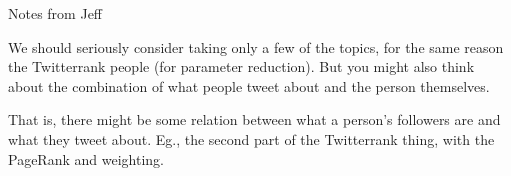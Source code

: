 Notes from Jeff

We should seriously consider taking only a few of the topics, for the same reason the Twitterrank people (for parameter reduction). But you might also think about the combination of what people tweet about and the person themselves.

That is, there might be some relation between what a person's followers are and what they tweet about. Eg., the second part of the Twitterrank thing, with the PageRank and weighting.
